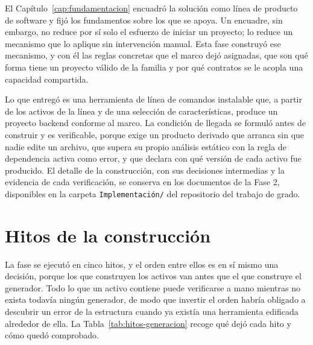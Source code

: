 \label{cap:generacion}

El Capítulo~\ref{cap:fundamentacion} encuadró la solución como línea de
producto de software y fijó los fundamentos sobre los que se apoya. Un
encuadre, sin embargo, no reduce por sí solo el esfuerzo de iniciar un
proyecto; lo reduce un mecanismo que lo aplique sin intervención manual. Esta
fase construyó ese mecanismo, y con él las reglas concretas que el marco dejó
asignadas, que son qué forma tiene un proyecto válido de la familia y por qué
contratos se le acopla una capacidad compartida.

Lo que entregó es una herramienta de línea de comandos instalable que, a
partir de los activos de la línea y de una selección de características,
produce un proyecto backend conforme al marco. La condición de llegada se
formuló antes de construir y es verificable, porque exige un producto derivado
que arranca sin que nadie edite un archivo, que supera su propio análisis
estático con la regla de dependencia activa como error, y que declara con qué
versión de cada activo fue producido. El detalle de la construcción, con sus
decisiones intermedias y la evidencia de cada verificación, se conserva en los
documentos de la Fase 2, disponibles en la carpeta \texttt{Implementación/}
del repositorio del trabajo de grado.

\section{Hitos de la construcción}
\label{sec:hitos-fase-2}

La fase se ejecutó en cinco hitos, y el orden entre ellos es en sí mismo una
decisión, porque los que construyen los activos van antes que el que construye
el generador. Todo lo que un activo contiene puede verificarse a mano mientras
no exista todavía ningún generador, de modo que invertir el orden habría
obligado a descubrir un error de la estructura cuando ya existía una
herramienta edificada alrededor de ella. La Tabla~\ref{tab:hitos-generacion}
recoge qué dejó cada hito y cómo quedó comprobado.

